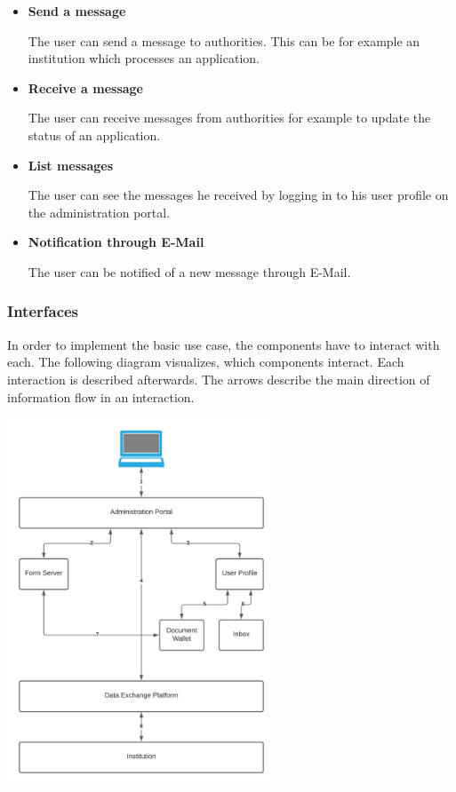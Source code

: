 \documentclass[
     12pt,         %
     a4paper,      %
     BCOR=10mm,version=first,     %
     DIV=14,version=first,        %
     ]{scrreprt}
\begin{document}
\begin{itemize}
    
    \item \textbf{Send a message}
    
    The user can send a message to authorities. This can be for example an institution which processes an application.
    
    \item \textbf{Receive a message}
    
    The user can receive messages from authorities for example to update the status of an application.
    
    \item \textbf{List messages}
    
    The user can see the messages he received by logging in to his user profile on the administration portal.
    
    \item \textbf{Notification through E-Mail}
    
    The user can be notified of a new message through E-Mail.

\end{itemize}

\subsubsection{Interfaces}
In order to implement the basic use case, the components have to interact with each. The following diagram visualizes, which components interact. Each interaction is described afterwards. The arrows describe the main direction of information flow in an interaction.

\begin{center}
    \includegraphics[width=8cm]{Interaction Diagram.png}
\end{center}
\end{document}
